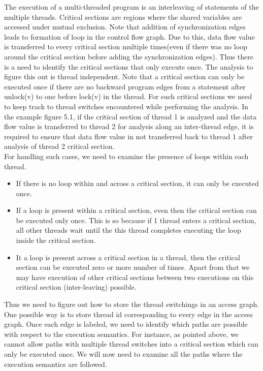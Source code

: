 The execution of a multi-threaded program is an interleaving of statements of the multiple threads. Critical sections are regions where the shared variables are accessed under mutual exclusion. Note that addition of synchronization edges leads to formation of loop in the control flow graph. Due to this, data flow value is transferred to every critical section multiple times(even if there was no loop around the critical section before adding the synchronization edges).  Thus there is a need to identify the critical sections that only execute once. The analysis to figure this out is thread independent. Note that a critical section can only be executed once if there are no backward program edges from a statement after unlock(v) to one before lock(v) in the thread. For such critical sections we need to keep track to thread switches encountered while performing the analysis. In the example figure 5.1, if the critical section of thread 1 is analyzed and the data flow value is transferred to thread 2 for analysis along an inter-thread edge, it is required to ensure that data flow value in not transferred back to thread 1 after analysis of thread 2 critical section. \\


For handling such cases, we need to examine the presence of loops within each thread. 
\begin{itemize}
	\item If there is no loop within and across a critical section, it can only be executed once.
	\item If a loop is present within a critical section, even then the critical section can be executed only once. This is so because if 1 thread enters a critical section, all other threads wait until the this thread completes executing the loop inside the critical section.
	\item It a loop is present across a critical section in a thread, then the critical section can be executed zero or more number of times. Apart from that we may have execution of other critical sections between two executions on this critical section (inter-leaving) possible.
\end{itemize} 

Thus we need to figure out how to store the thread switchings in an access graph. One possible way is to store thread id corresponding to every edge in the access graph. Once each edge is labeled, we need to identify which paths are possible with respect to the execution semantics. For instance, as pointed above, we cannot allow paths with multiple thread switches into a critical section which can only be executed once. We will now need to examine all the paths where the execution semantics are followed. \\

